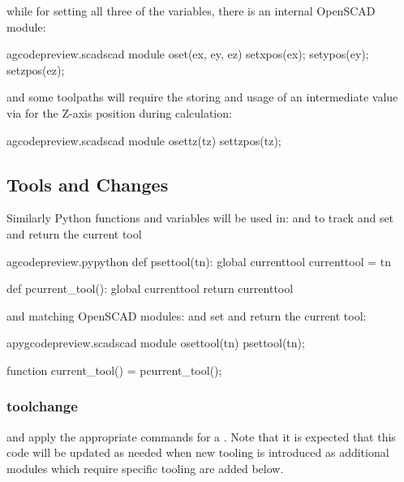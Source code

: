 \documentclass{ltxdoc}
\begin{document}
\noindent{} while for setting all three of the variables, there is
an internal OpenSCAD module:

\lstset{firstnumber=\thegcpscad}
\begin{writecode}{a}{gcodepreview.scad}{scad}
module oset(ex, ey, ez) {
    setxpos(ex);
    setypos(ey);
    setzpos(ez);
}

\end{writecode}
\addtocounter{gcpscad}{6}
 
\noindent and some toolpaths will require the storing and usage of an intermediate value via
 for the Z-axis position during calculation:

\lstset{firstnumber=\thegcpscad}
\begin{writecode}{a}{gcodepreview.scad}{scad}
module osettz(tz) {
    settzpos(tz);
}

\end{writecode}
\addtocounter{gcpscad}{4}

\subsection{Tools and Changes}
 
Similarly Python functions and variables will be used in:  and  to track and set and return the current tool
 
\lstset{firstnumber=\thegcpy}
\begin{writecode}{a}{gcodepreview.py}{python}
def psettool(tn):
    global currenttool
    currenttool = tn

def pcurrent_tool():
    global currenttool
    return currenttool

\end{writecode}
\addtocounter{gcpy}{8}
 
\noindent and matching OpenSCAD modules:
 and
set and return the current tool: 
  
\lstset{firstnumber=\thepyscad}
\begin{writecode}{a}{pygcodepreview.scad}{scad}
module osettool(tn){
    psettool(tn);
}

function current_tool() = pcurrent_tool();

\end{writecode}
\addtocounter{pyscad}{6}

\subsubsection{toolchange}
\noindent and apply the appropriate commands for a \label{subsubsec:toolchange}
. Note that it is expected that this code will be updated as needed 
when new tooling is introduced as additional modules which require specific tooling are added below. 
\end{document}
